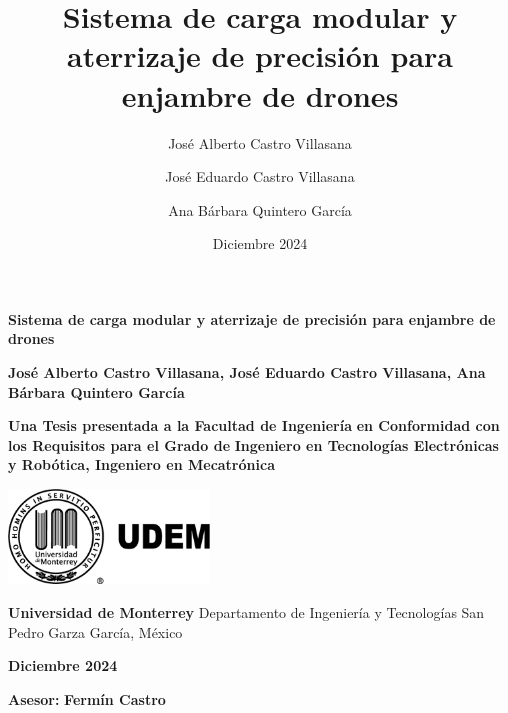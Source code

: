 \documentclass[11pt]{report} %
\title{Sistema de carga modular y aterrizaje de precisión para enjambre de drones} %
\author{José Alberto Castro Villasana \and José Eduardo Castro Villasana \and Ana Bárbara Quintero García} %
\date{Diciembre 2024} %
\begin{document}
\begin{titlepage}
    \centering
    \vspace*{1cm}
    
    {\Huge\textbf{Sistema de carga modular y aterrizaje de precisión para enjambre de drones}} %
    
    \vspace{2.5cm} %
    {\Large\textbf{José Alberto Castro Villasana, José Eduardo Castro Villasana, Ana Bárbara Quintero García}} %
    
    \vfill
    
    {\large\textbf{Una Tesis presentada a la Facultad de Ingeniería}} %
    {\large\textbf{en Conformidad con los Requisitos para el Grado de}} %
    {\large\textbf{Ingeniero en Tecnologías Electrónicas y Robótica, Ingeniero en Mecatrónica}} %
    
    \vspace{2cm}
    
    \includegraphics[width=0.4\textwidth]{pictures/logo_udem.png} %
    
    \vspace{2cm}
    
    {\large\textbf{Universidad de Monterrey} \newline Departamento de Ingeniería y Tecnologías \newline San Pedro Garza García, México} %
    
    \vspace{1.5cm}
    {\large\textbf{Diciembre 2024}} %
    
    \vfill
    {\large\textbf{Asesor:} \textbf{Fermín Castro}} %
    
\end{titlepage}

\tableofcontents
\newpage

\onehalfspacing%

\end{document}
